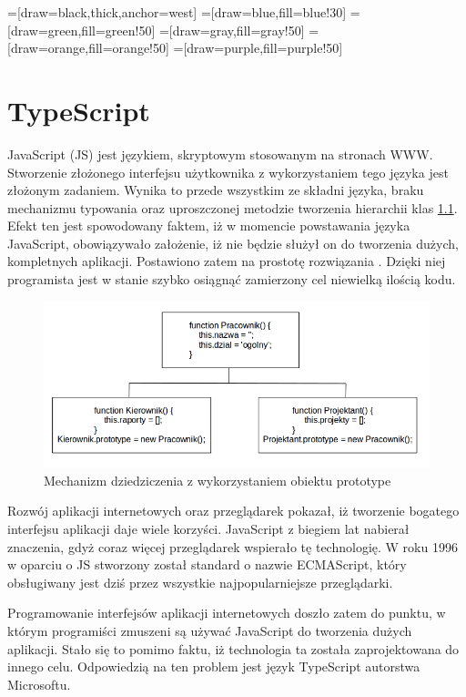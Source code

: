 \usetikzlibrary{trees}
=[draw=black,thick,anchor=west]
=[draw=blue,fill=blue!30]
=[draw=green,fill=green!50]
=[draw=gray,fill=gray!50]
=[draw=orange,fill=orange!50]
=[draw=purple,fill=purple!50]
\chapter{TypeScript}
JavaScript (JS) jest językiem, skryptowym stosowanym na stronach WWW\cite{javascript-book}. Stworzenie złożonego interfejsu użytkownika z wykorzystaniem tego języka jest złożonym zadaniem. Wynika to przede wszystkim ze składni języka, braku mechanizmu typowania oraz uproszczonej metodzie tworzenia hierarchii klas \ref{fig:javascript-inheritance}. Efekt ten jest spowodowany faktem, iż w momencie powstawania języka JavaScript, obowiązywało założenie, iż nie będzie służył on do tworzenia dużych, kompletnych aplikacji. Postawiono zatem na prostotę rozwiązania \cite{javascript-book}. Dzięki niej programista jest w stanie szybko osiągnąć zamierzony cel niewielką ilością kodu.

\begin{figure}[h]
	\includegraphics[width=140mm]{./img/javascript-inheritance.png}
	\centering
	\caption{Mechanizm dziedziczenia z wykorzystaniem obiektu prototype}
	\label{fig:javascript-inheritance}
\end{figure}

Rozwój aplikacji internetowych oraz przeglądarek pokazał, iż tworzenie bogatego interfejsu aplikacji daje wiele korzyści. JavaScript z biegiem lat nabierał znaczenia, gdyż coraz więcej przeglądarek wspierało tę technologię. W roku 1996 w oparciu o JS stworzony został standard o nazwie ECMAScript, który obsługiwany jest dziś przez wszystkie najpopularniejsze przeglądarki. 

Programowanie interfejsów aplikacji internetowych doszło zatem do punktu, w którym programiści zmuszeni są używać JavaScript do tworzenia dużych aplikacji\cite{javascript-book}. Stało się to pomimo faktu, iż technologia ta została zaprojektowana do innego celu. Odpowiedzią na ten problem jest język TypeScript autorstwa Microsoftu.

